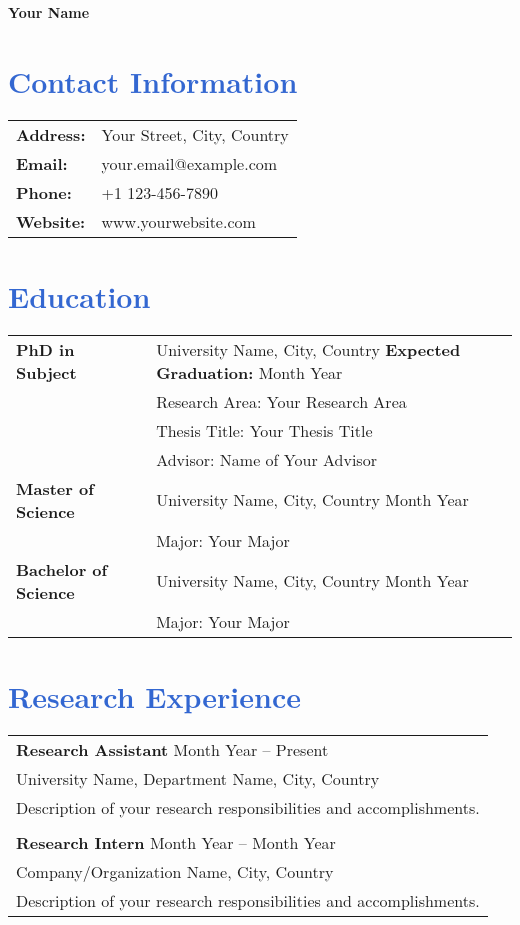 \documentclass[11pt,a4paper]{article}
\begin{document}
\begin{center}
    \Huge\textbf{\textcolor{primary}{Your Name}}
\end{center}

\section*{\textcolor{highlight}{Contact Information}}
\begin{tabularx}{\textwidth}{@{}lX}
    \textbf{Address:} & Your Street, City, Country \\
    \textbf{Email:} & your.email@example.com \\
    \textbf{Phone:} & +1 123-456-7890 \\
    \textbf{Website:} & www.yourwebsite.com \\
\end{tabularx}

\section*{\textcolor{highlight}{Education}}
\begin{tabularx}{\textwidth}{@{}lX}
    \textbf{PhD in Subject} & University Name, City, Country \hfill \textbf{Expected Graduation:} Month Year \\
    & Research Area: Your Research Area \\
    & Thesis Title: Your Thesis Title \\
    & Advisor: Name of Your Advisor \\
    \textbf{Master of Science} & University Name, City, Country \hfill Month Year \\
    & Major: Your Major \\
    \textbf{Bachelor of Science} & University Name, City, Country \hfill Month Year \\
    & Major: Your Major \\
\end{tabularx}

\section*{\textcolor{highlight}{Research Experience}}
\begin{tabularx}{\textwidth}{@{}X}
    \textbf{Research Assistant} \hfill Month Year -- Present \\
    University Name, Department Name, City, Country \\
    Description of your research responsibilities and accomplishments. \\
    \\
    \textbf{Research Intern} \hfill Month Year -- Month Year \\
    Company/Organization Name, City, Country \\
    Description of your research responsibilities and accomplishments. \\
\end{tabularx}
\end{document}
